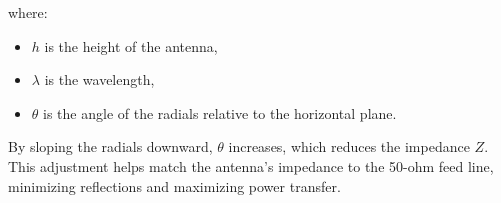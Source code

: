 where:
\begin{itemize}
    \item \( h \) is the height of the antenna,
    \item \( \lambda \) is the wavelength,
    \item \( \theta \) is the angle of the radials relative to the horizontal plane.
\end{itemize}

By sloping the radials downward, \( \theta \) increases, which reduces the impedance \( Z \). This adjustment helps match the antenna's impedance to the 50-ohm feed line, minimizing reflections and maximizing power transfer.

